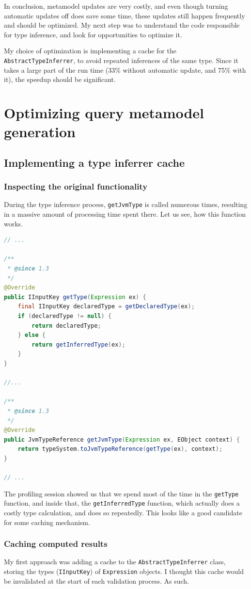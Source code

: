 \documentclass[11pt,a4paper,oneside]{report}
\begin{document}
In conclusion, metamodel updates are very costly, and even though turning
automatic updates off does save some time, these updates still happen
frequently and should be optimized. My next step was to understand the code
responsible for type inference, and look for opportunities to optimize it.

My choice of optimization is implementing a cache for the
\texttt{AbstractTypeInferrer}, to avoid repeated inferences of the same type.
Since it takes a large part of the run time (33\% without automatic update,
and 75\% with it), the speedup should be significant.

\chapter{Optimizing query metamodel generation}
\section{Implementing a type inferrer cache}
\subsection{Inspecting the original functionality}
During the type inference process, \texttt{getJvmType} is called numerous times,
resulting in a massive amount of processing time spent there. Let us see, how
this function works.

\begin{lstlisting}[language=java]
// ...

/**
 * @since 1.3
 */
@Override
public IInputKey getType(Expression ex) {
    final IInputKey declaredType = getDeclaredType(ex);
    if (declaredType != null) {
        return declaredType;
    } else {
        return getInferredType(ex);
    }
}

//...

/**
 * @since 1.3
 */
@Override
public JvmTypeReference getJvmType(Expression ex, EObject context) {
    return typeSystem.toJvmTypeReference(getType(ex), context);
}

// ...
\end{lstlisting}

The profiling session showed us that we spend most of the time in the
\texttt{getType} function, and inside that, the \texttt{getInferredType}
function, which actually does a costly type calculation, and does so repeatedly.
This looks like a good candidate for some caching mechanism.

\subsection{Caching computed results}
My first approach was adding a cache to the \texttt{AbstractTypeInferrer} class,
storing the types (\texttt{IInputKey}) of \texttt{Expression} objects. I thought
this cache would be invalidated at the start of each validation process. As
such.
\end{document}
